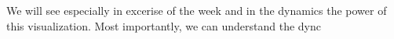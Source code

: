 We will see especially in excerise of the week and in the dynamics the power of this visualization. Most importantly, we can understand the dync